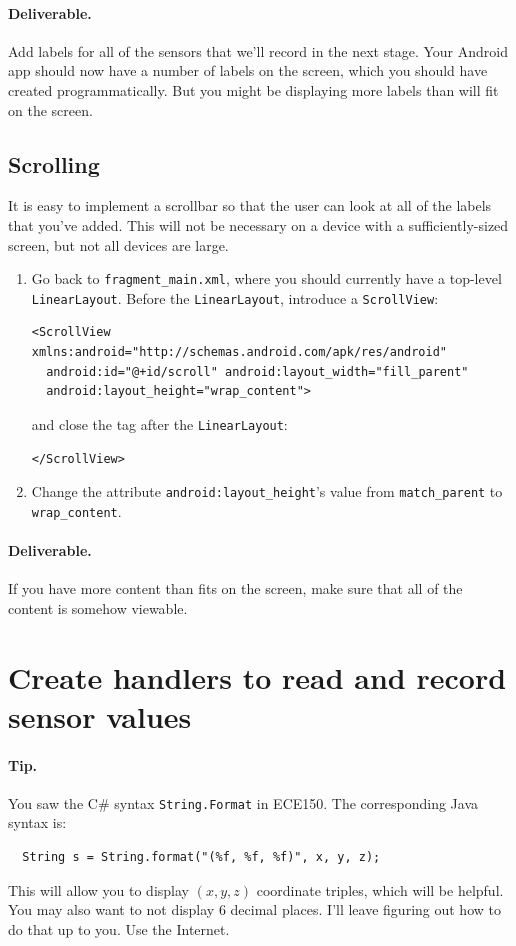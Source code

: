 \documentclass[10pt]{article}
\begin{document}
\paragraph{Deliverable.} Add labels for all of the sensors that we'll record in the next stage. Your Android app should now have a number of labels on the screen, which you should have created programmatically. But you might be displaying more labels than will fit on the screen.

\subsection{Scrolling}
It is easy to implement a scrollbar so that the user can look at all of the labels that you've added. This will not be necessary on a device with a sufficiently-sized screen, but not all devices are large.

\begin{enumerate}
\item Go back to {\tt fragment\_main.xml}, where you should currently have a top-level {\tt LinearLayout}. Before the {\tt LinearLayout}, introduce a {\tt ScrollView}:
\begin{lstlisting}
<ScrollView xmlns:android="http://schemas.android.com/apk/res/android"
  android:id="@+id/scroll" android:layout_width="fill_parent"
  android:layout_height="wrap_content">
\end{lstlisting}
and close the tag after the {\tt LinearLayout}:
\begin{lstlisting}
</ScrollView>
\end{lstlisting}
\item Change the attribute \verb+android:layout_height+'s value from \verb+match_parent+ to \verb+wrap_content+.
\end{enumerate}

\paragraph{Deliverable.} If you have more content than fits on the screen, make sure that all of the content is somehow viewable.

\section{Create handlers to read and record sensor values}

\paragraph{Tip.} You saw the C\# syntax {\tt String.Format} in ECE150. The corresponding Java syntax is:
\begin{verbatim}
  String s = String.format("(%f, %f, %f)", x, y, z);
\end{verbatim}
This will allow you to display $(x, y, z)$ coordinate triples, which will be helpful. You may also want to not display 6 decimal places. I'll leave figuring out how to do that up to you. Use the Internet.
\end{document}
